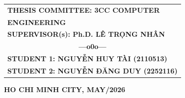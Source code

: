 \documentclass[a4paper, 12pt]{report}
\theoremstyle{definition}
\begin{document}
\begin{titlepage}

\begin{flushleft}
\hspace*{4.5cm} %
\begin{tabular}{l} %
{\fontsize{15pt}{18pt}\selectfont \textbf{THESIS COMMITTEE: 3CC COMPUTER}}\\[0.15cm]
{\fontsize{15pt}{18pt}\selectfont \textbf{\phantom{THESIS COMMITTEE: }ENGINEERING}}\\[0.15cm]
{\fontsize{15pt}{18pt}\selectfont \textbf{SUPERVISOR(s): Ph.D. LÊ TRỌNG NHÂN}}\\[0.1cm]
\multicolumn{1}{c}{\fontsize{15pt}{18pt}\selectfont \textbf{---o0o---}}\\[0.15cm]
{\fontsize{15pt}{18pt}\selectfont \textbf{STUDENT 1: NGUYỄN HUY TÀI (2110513)}}\\[0.15cm]
{\fontsize{15pt}{18pt}\selectfont \textbf{STUDENT 2: NGUYỄN ĐĂNG DUY (2252116)}}\\[0.15cm]
\end{tabular}
\end{flushleft}


\vspace{1.0cm}
\begin{center}
{\fontsize{15pt}{18pt}\selectfont \textbf{HO CHI MINH CITY, MAY/2026}}
\end{center}

\end{titlepage}
\newpage
\clearpage
{}





\newpage
\tableofcontents
\newpage
\listoffigures
\newpage
\listoftables
\newpage
\pagestyle{fancy}


\newpage

\newpage

\newpage

\newpage

\newpage

\newpage
% 
\nocite{*}



\newpage

\end{document}
